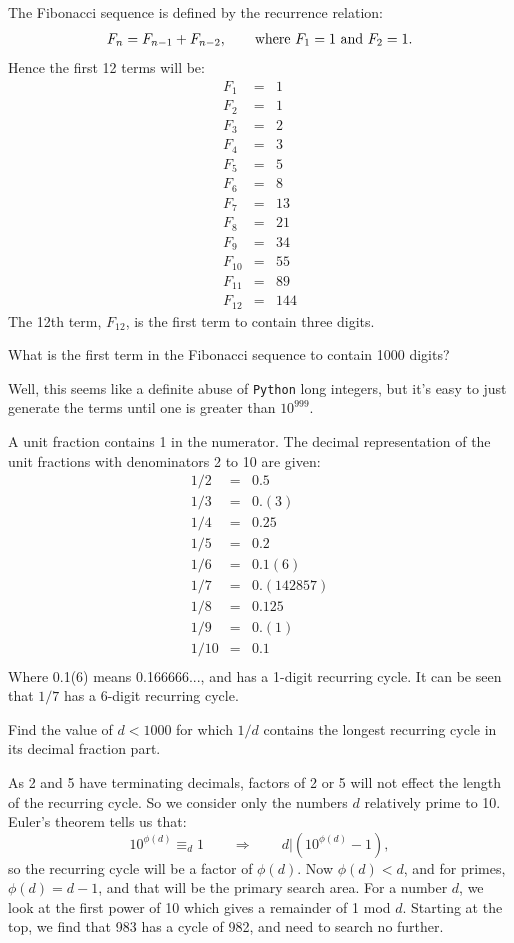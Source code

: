 The Fibonacci sequence is defined by the recurrence relation:
$$ F_n = F_{n-1} + F_{n-2}, \qquad \hbox{where } F_1 = 1\hbox{ and }F_2 = 1.$$
Hence the first 12 terms will be:
\begin{eqnarray*}
    F_1 &= &1 \\
    F_2 &= &1 \\
    F_3 &= &2 \\
    F_4 &= &3 \\
    F_5 &= &5 \\
    F_6 &= &8 \\
    F_7 &= &13 \\
    F_8 &= &21 \\
    F_9 &= &34 \\
    F_{10} &= &55 \\
    F_{11} &= &89 \\
    F_{12} &= &144
\end{eqnarray*}
The 12th term, $F_{12}$, is the first term to contain three digits.

What is the first term in the Fibonacci sequence to contain 1000 digits?

 Well, this seems like a definite abuse of \verb"Python" long integers, but it's easy to just
generate the terms until one is greater than $10^{999}$.



A unit fraction contains 1 in the numerator. The decimal representation of the unit fractions with denominators 2 to 10 are given:
\begin{eqnarray*}
1/2 &= &0.5 \\
1/3 &= &0.(3) \\
1/4 &= &0.25 \\
1/5 &= &0.2 \\
1/6 &= &0.1(6) \\
1/7 &= &0.(142857) \\
1/8 &= &0.125 \\
1/9 &= &0.(1) \\
1/10 &= &0.1 \\
\end{eqnarray*}
Where 0.1(6) means 0.166666..., and has a 1-digit recurring cycle. It can be seen that $1/7$ has a 6-digit recurring cycle.

Find the value of $d < 1000$ for which $1/d$ contains the longest recurring cycle in its decimal fraction part.

As 2 and 5 have terminating decimals, factors of 2 or 5 will not effect the length of the recurring cycle.
So we consider only the numbers $d$ relatively prime to 10.  Euler's theorem tells us that:
$$10^{\phi(d)} \equiv_{d} 1 \qquad \Rightarrow \qquad d|\left(10^{\phi(d)}-1\right),$$
so the recurring cycle will be a factor of $\phi(d)$.  Now $\phi(d) < d$, and for primes, $\phi(d)=d-1$, and that will be the primary search area.  For a number $d$, we look at the first power of 10 which gives a remainder of 1 mod $d$.
Starting at the top, we find that 983 has a cycle of 982, and need to search no further.



